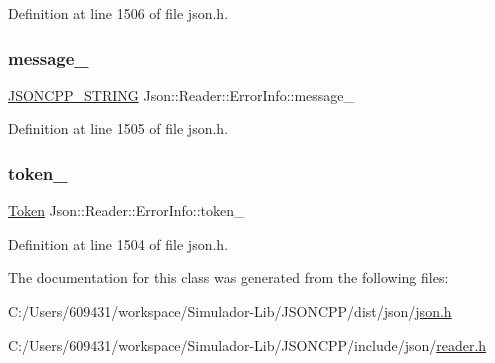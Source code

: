 Definition at line 1506 of file json.\+h.

\hypertarget{class_json_1_1_reader_1_1_error_info_a3529d420f7c83165565bf294a5d6ed13}{}\label{class_json_1_1_reader_1_1_error_info_a3529d420f7c83165565bf294a5d6ed13} 
\subsubsection{\texorpdfstring{message\+\_\+}{message\_}}
{\footnotesize\ttfamily \hyperlink{config_8h_a1e723f95759de062585bc4a8fd3fa4be}{J\+S\+O\+N\+C\+P\+P\+\_\+\+S\+T\+R\+I\+NG} Json\+::\+Reader\+::\+Error\+Info\+::message\+\_\+}



Definition at line 1505 of file json.\+h.

\hypertarget{class_json_1_1_reader_1_1_error_info_a52e1c71b12eb1c3f0395d7ef1e778ce6}{}\label{class_json_1_1_reader_1_1_error_info_a52e1c71b12eb1c3f0395d7ef1e778ce6} 
\subsubsection{\texorpdfstring{token\+\_\+}{token\_}}
{\footnotesize\ttfamily \hyperlink{class_json_1_1_reader_1_1_token}{Token} Json\+::\+Reader\+::\+Error\+Info\+::token\+\_\+}



Definition at line 1504 of file json.\+h.



The documentation for this class was generated from the following files\+:\begin{DoxyCompactItemize}
\item 
C\+:/\+Users/609431/workspace/\+Simulador-\/\+Lib/\+J\+S\+O\+N\+C\+P\+P/dist/json/\hyperlink{dist_2json_2json_8h}{json.\+h}\item 
C\+:/\+Users/609431/workspace/\+Simulador-\/\+Lib/\+J\+S\+O\+N\+C\+P\+P/include/json/\hyperlink{reader_8h}{reader.\+h}\end{DoxyCompactItemize}
